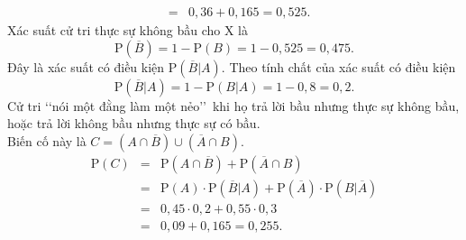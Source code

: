 \begin{ex}
{\begin{itemchoice}
\begin{eqnarray*}
				&=& 0{,}36 + 0{,}165 = 0{,}525.
			\end{eqnarray*}
			Xác suất cử tri thực sự không bầu cho X là
			\[\mathrm{P}(\overline{B}) = 1 - \mathrm{P}(B) = 1 - 0{,}525 = 0{,}475. \]
			\itemch Đây là xác suất có điều kiện $\mathrm{P}(\overline{B}|A)$. Theo tính chất của xác suất có điều kiện
			\[ \mathrm{P}(\overline{B}|A) = 1 - \mathrm{P}(B|A) = 1 - 0{,}8 = 0{,}2. \]
			\itemch Cử tri \lq\lq nói một đằng làm một nẻo\rq\rq \ khi họ trả lời bầu nhưng thực sự không bầu, hoặc trả lời không bầu nhưng thực sự có bầu.\\
			Biến cố này là $C = (A \cap \overline{B}) \cup (\overline{A} \cap B)$.
			\allowdisplaybreaks
			\begin{eqnarray*}
				\mathrm{P}(C) &=& \mathrm{P}(A \cap \overline{B}) + \mathrm{P}(\overline{A} \cap B) \\
				&=& \mathrm{P}(A) \cdotp \mathrm{P}(\overline{B}|A) + \mathrm{P}(\overline{A}) \cdotp \mathrm{P}(B|\overline{A}) \\
				&=& 0{,}45 \cdotp 0{,}2 + 0{,}55 \cdotp 0{,}3 \\
				&=& 0{,}09 + 0{,}165 = 0{,}255.
			\end{eqnarray*}
		\end{itemchoice}
	}
\end{ex}

